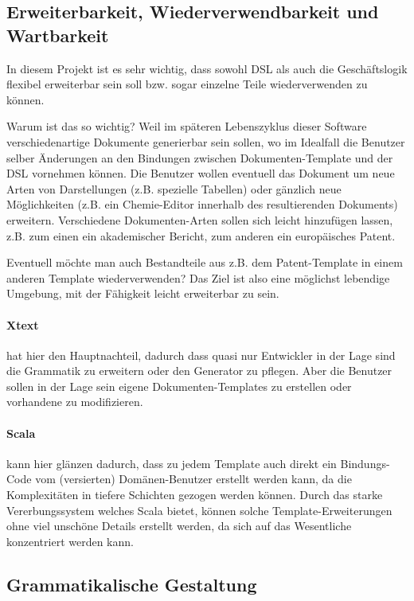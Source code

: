 \subsection{Erweiterbarkeit, Wiederverwendbarkeit und Wartbarkeit}
\label{sec-erweiterbar}

In diesem Projekt ist es sehr wichtig, dass sowohl DSL als auch
die Geschäftslogik flexibel erweiterbar sein soll bzw. sogar
einzelne Teile wiederverwenden zu können.

Warum ist das so wichtig? Weil im späteren Lebenszyklus dieser Software
verschiedenartige Dokumente generierbar sein sollen, wo im Idealfall
die Benutzer selber Änderungen an den Bindungen zwischen
Dokumenten-Template und der DSL vornehmen können. Die Benutzer
wollen eventuell das Dokument um neue Arten von Darstellungen (z.B. spezielle
Tabellen) oder gänzlich neue Möglichkeiten (z.B. ein Chemie-Editor
innerhalb des resultierenden Dokuments) erweitern.
Verschiedene Dokumenten-Arten sollen sich leicht hinzufügen lassen,
z.B. zum einen ein akademischer Bericht, zum anderen ein europäisches Patent.

Eventuell möchte man auch Bestandteile aus z.B. dem Patent-Template in
einem anderen Template wiederverwenden? Das Ziel ist also eine
möglichst lebendige Umgebung, mit der Fähigkeit leicht erweiterbar zu sein.

\paragraph{Xtext} hat hier den Hauptnachteil, dadurch dass quasi nur
Entwickler in der Lage sind die Grammatik zu erweitern oder den
Generator zu pflegen. Aber die Benutzer sollen in der Lage sein
eigene Dokumenten-Templates zu erstellen oder vorhandene zu modifizieren.

\paragraph{Scala} kann hier glänzen dadurch, dass zu jedem Template auch
direkt ein Bindungs-Code vom (versierten) Domänen-Benutzer erstellt
werden kann, da die Komplexitäten in tiefere Schichten gezogen werden können.
Durch das starke Vererbungssystem welches Scala bietet, können solche
Template-Erweiterungen ohne viel unschöne Details erstellt werden, da sich
auf das Wesentliche konzentriert werden kann.


\subsection{Grammatikalische Gestaltung}\label{sec-grammatikGestaltung}

